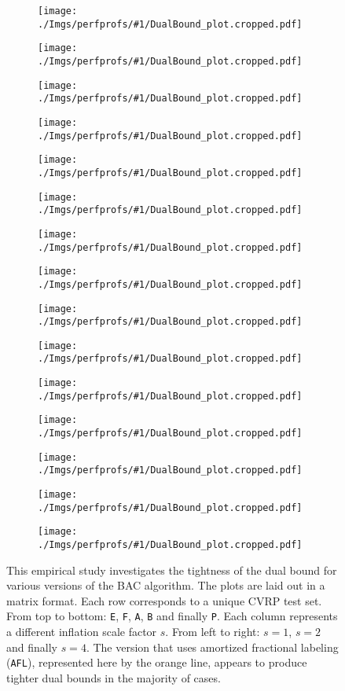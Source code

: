 
\newcommand{\IncludePerfProfSubFiguresBatchOne}[1]{
	\begin{subfigure}{0.30\textwidth}
		\centering
		\texttt{[image: ./Imgs/perfprofs/\#1/DualBound\_plot.cropped.pdf]}
	\end{subfigure}
}

\begin{figure}[t]
	\IncludePerfProfSubFiguresBatchOne{Fractional-labeling-comparison-for-E-scaled-1.0}
	\hfill
	\IncludePerfProfSubFiguresBatchOne{Fractional-labeling-comparison-for-E-scaled-2.0}
	\hfill
	\IncludePerfProfSubFiguresBatchOne{Fractional-labeling-comparison-for-E-scaled-4.0}

	\IncludePerfProfSubFiguresBatchOne{Fractional-labeling-comparison-for-F-scaled-1.0}
	\hfill
	\IncludePerfProfSubFiguresBatchOne{Fractional-labeling-comparison-for-F-scaled-2.0}
	\hfill
	\IncludePerfProfSubFiguresBatchOne{Fractional-labeling-comparison-for-F-scaled-4.0}

	\IncludePerfProfSubFiguresBatchOne{Fractional-labeling-comparison-for-A-scaled-1.0}
	\hfill
	\IncludePerfProfSubFiguresBatchOne{Fractional-labeling-comparison-for-A-scaled-2.0}
	\hfill
	\IncludePerfProfSubFiguresBatchOne{Fractional-labeling-comparison-for-A-scaled-4.0}

	\IncludePerfProfSubFiguresBatchOne{Fractional-labeling-comparison-for-B-scaled-1.0}
	\hfill
	\IncludePerfProfSubFiguresBatchOne{Fractional-labeling-comparison-for-B-scaled-2.0}
	\hfill
	\IncludePerfProfSubFiguresBatchOne{Fractional-labeling-comparison-for-B-scaled-4.0}

	\IncludePerfProfSubFiguresBatchOne{Fractional-labeling-comparison-for-P-scaled-1.0}
	\hfill
	\IncludePerfProfSubFiguresBatchOne{Fractional-labeling-comparison-for-P-scaled-2.0}
	\hfill
	\IncludePerfProfSubFiguresBatchOne{Fractional-labeling-comparison-for-P-scaled-2.0}

	\caption{
		This empirical study investigates the tightness of the dual bound for various versions of the BAC algorithm.
		The plots are laid out in a matrix format.
		Each row corresponds to a unique CVRP test set.
		From top to bottom: \texttt{E}, \texttt{F}, \texttt{A}, \texttt{B} and finally \texttt{P}.
		Each column represents a different inflation scale factor $s$.
		From left to right: $s = 1$, $s = 2$ and finally $s = 4$.
		The version that uses amortized fractional labeling (\texttt{AFL}), represented here by the orange line, appears to produce tighter dual bounds in the majority of cases.
	}
	\label{fig:perfprofs-batch1-part1}
\end{figure}
